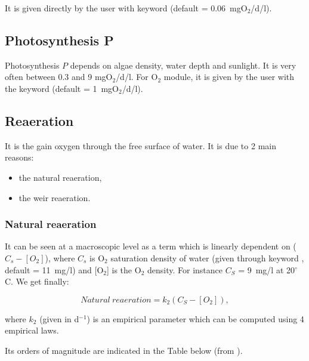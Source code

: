 It is given directly by the user with keyword 
(default = 0.06~mgO$_2$/d/l).


\subsection{Photosynthesis P}

Photosynthesis $P$ depends on algae density,
water depth and sunlight.
It is very often between 0.3 and 9 mgO$_2$/d/l.
For O$_2$ module, it is given by the user with the keyword
 (default = 1~mgO$_2$/d/l).


\subsection{Reaeration}

It is the gain oxygen through the free surface of water.
It is due to 2 main reasons:
\begin{itemize}
\item the natural reaeration,
\item the weir reaeration.
\end{itemize}

\subsubsection{Natural reaeration}
It can be seen at a macroscopic level
as a term which is linearly dependent on ($C_s-[O_2]$),
where $C_s$ is O$_2$ saturation density of water
(given through keyword ,
default = 11~mg/l) and [O$_2$] is the O$_2$ density.
For instance $C_S$ = 9~mg/l at 20$^\circ$C.
We get finally:

\begin{equation*}
Natural~reaeration = k_2(C_S-[O_2]),
\end{equation*}

where $k_2$ (given in d$^{-1}$) is an empirical parameter
which can be computed using 4 empirical laws.

Its orders of magnitude are indicated in the Table below
(from \cite{tchobanoglous_wq_1985}).\\

